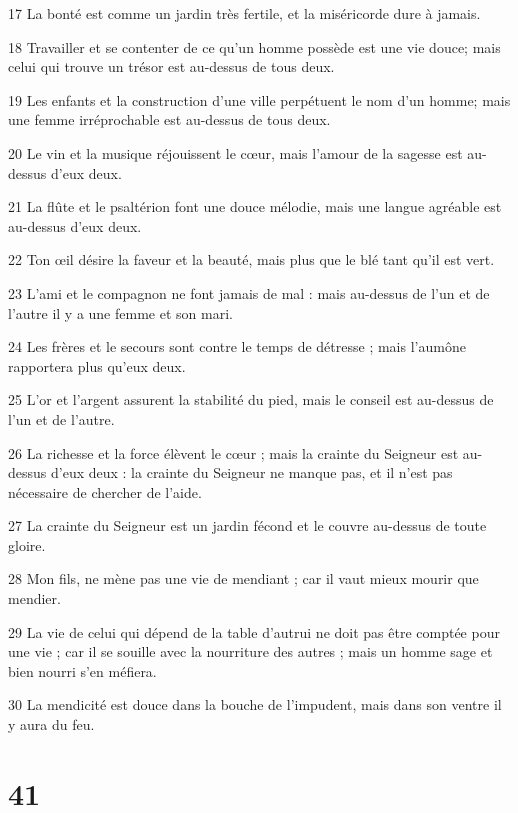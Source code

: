 \par 17 La bonté est comme un jardin très fertile, et la miséricorde dure à jamais.
\par 18 Travailler et se contenter de ce qu'un homme possède est une vie douce; mais celui qui trouve un trésor est au-dessus de tous deux.
\par 19 Les enfants et la construction d'une ville perpétuent le nom d'un homme; mais une femme irréprochable est au-dessus de tous deux.
\par 20 Le vin et la musique réjouissent le cœur, mais l'amour de la sagesse est au-dessus d'eux deux.
\par 21 La flûte et le psaltérion font une douce mélodie, mais une langue agréable est au-dessus d'eux deux.
\par 22 Ton œil désire la faveur et la beauté, mais plus que le blé tant qu'il est vert.
\par 23 L'ami et le compagnon ne font jamais de mal : mais au-dessus de l'un et de l'autre il y a une femme et son mari.
\par 24 Les frères et le secours sont contre le temps de détresse ; mais l'aumône rapportera plus qu'eux deux.
\par 25 L'or et l'argent assurent la stabilité du pied, mais le conseil est au-dessus de l'un et de l'autre.
\par 26 La richesse et la force élèvent le cœur ; mais la crainte du Seigneur est au-dessus d'eux deux : la crainte du Seigneur ne manque pas, et il n'est pas nécessaire de chercher de l'aide.
\par 27 La crainte du Seigneur est un jardin fécond et le couvre au-dessus de toute gloire.
\par 28 Mon fils, ne mène pas une vie de mendiant ; car il vaut mieux mourir que mendier.
\par 29 La vie de celui qui dépend de la table d'autrui ne doit pas être comptée pour une vie ; car il se souille avec la nourriture des autres ; mais un homme sage et bien nourri s'en méfiera.
\par 30 La mendicité est douce dans la bouche de l'impudent, mais dans son ventre il y aura du feu.

\chapter{41}

